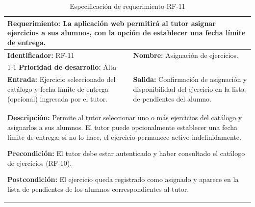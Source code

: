 \begin{table}[H]
\caption{Especificación de requerimiento RF-11}
\centering
\renewcommand{\arraystretch}{1.3}
\setlength{\tabcolsep}{6pt}
\begin{tabular}{|p{7cm}|p{8cm}|}
\hline
\multicolumn{2}{|p{15cm}|}{\textbf{Requerimiento:} La aplicación web permitirá al tutor asignar ejercicios a sus alumnos, con la opción de establecer una fecha límite de entrega.} \\ \hline
\textbf{Identificador:} RF-11 &
\textbf{Nombre:} Asignación de ejercicios. \\ \cline{1-1}
\textbf{Prioridad de desarrollo:} Alta &
\multicolumn{1}{p{8cm}|}{} \\ \hline
\textbf{Entrada:} Ejercicio seleccionado del catálogo y fecha límite de entrega (opcional) ingresada por el tutor. &
\textbf{Salida:} Confirmación de asignación y disponibilidad del ejercicio en la lista de pendientes del alumno. \\ \hline
\multicolumn{2}{|p{15cm}|}{
\textbf{Descripción:} Permite al tutor seleccionar uno o más ejercicios del catálogo y asignarlos a sus alumnos. El tutor puede opcionalmente establecer una fecha límite de entrega; si no lo hace, el ejercicio permanece activo indefinidamente.

\vspace{0.2cm}
\textbf{Precondición:} El tutor debe estar autenticado y haber consultado el catálogo de ejercicios (RF-10).

\vspace{0.2cm}
\textbf{Postcondición:} El ejercicio queda registrado como asignado y aparece en la lista de pendientes de los alumnos correspondientes al tutor.
} \\ \hline
\end{tabular}
\label{tab:rf11}
\end{table}


